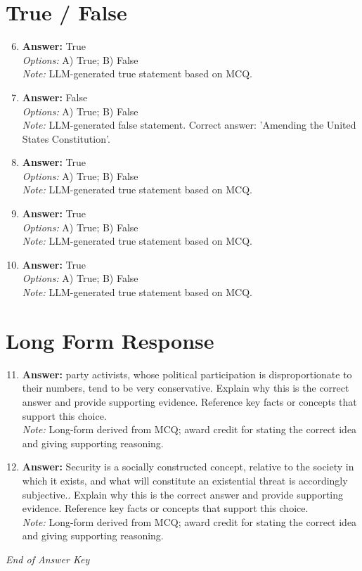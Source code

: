 \documentclass[12pt]{article}
\begin{document}
\section*{True / False}
\begin{enumerate}[label=\arabic*.]
\setcounter{enumi}{5}
\item \textbf{Answer:} True
\\ \textit{Options:} A) True; B) False
\\ \textit{Note:} LLM-generated true statement based on MCQ.
\item \textbf{Answer:} False
\\ \textit{Options:} A) True; B) False
\\ \textit{Note:} LLM-generated false statement. Correct answer: 'Amending the United States Constitution'.
\item \textbf{Answer:} True
\\ \textit{Options:} A) True; B) False
\\ \textit{Note:} LLM-generated true statement based on MCQ.
\item \textbf{Answer:} True
\\ \textit{Options:} A) True; B) False
\\ \textit{Note:} LLM-generated true statement based on MCQ.
\item \textbf{Answer:} True
\\ \textit{Options:} A) True; B) False
\\ \textit{Note:} LLM-generated true statement based on MCQ.
\end{enumerate}

\section*{Long Form Response}
\begin{enumerate}[label=\arabic*.]
\setcounter{enumi}{10}
\item \textbf{Answer:} party activists, whose political participation is disproportionate to their numbers, tend to be very conservative. Explain why this is the correct answer and provide supporting evidence. Reference key facts or concepts that support this choice.
\\ \textit{Note:} Long-form derived from MCQ; award credit for stating the correct idea and giving supporting reasoning.
\item \textbf{Answer:} Security is a socially constructed concept, relative to the society in which it exists, and what will constitute an existential threat is accordingly subjective.. Explain why this is the correct answer and provide supporting evidence. Reference key facts or concepts that support this choice.
\\ \textit{Note:} Long-form derived from MCQ; award credit for stating the correct idea and giving supporting reasoning.
\end{enumerate}

\vfill
\noindent\textit{End of Answer Key}
\end{document}
